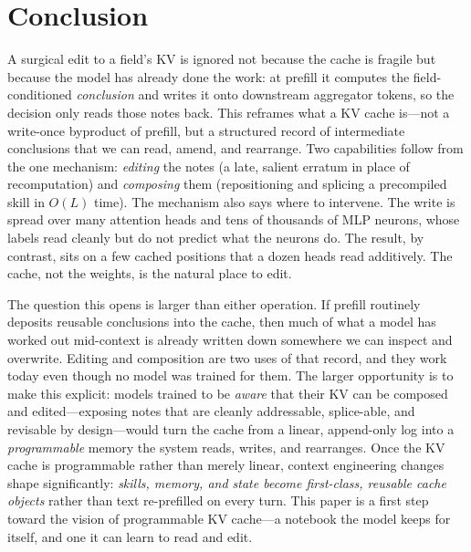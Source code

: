 \section{Conclusion}
\label{sec:conclusion}

A surgical edit to a field's KV is ignored not because the cache is fragile but because the model has
already done the work: at prefill it computes the field-conditioned \emph{conclusion} and writes it onto
downstream aggregator tokens, so the decision only reads those notes back. This reframes what a KV cache
is---not a write-once byproduct of prefill, but a structured record of intermediate conclusions that we can
read, amend, and rearrange. Two capabilities follow from the one mechanism: \emph{editing} the notes (a late,
salient erratum in place of recomputation) and \emph{composing} them (repositioning and splicing a
precompiled skill in $O(L)$ time). The mechanism also says where to intervene. The write is spread over many
attention heads and tens of thousands of MLP neurons, whose labels read cleanly but do not predict what the
neurons do. The result, by contrast, sits on a few cached positions that a dozen heads read additively. The
cache, not the weights, is the natural place to edit.

The question this opens is larger than either operation. If prefill routinely deposits reusable conclusions
into the cache, then much of what a model has worked out mid-context is already written down somewhere we can
inspect and overwrite. Editing
and composition are two uses of that record, and they work today even though no model was trained for them.
The larger opportunity is to make this explicit: models trained to be \emph{aware} that their KV can be
composed and edited---exposing notes that are cleanly addressable, splice-able, and revisable by design---would
turn the cache from a linear, append-only log into a \emph{programmable} memory the system reads, writes, and
rearranges. Once the KV cache is programmable rather than merely linear, context engineering changes
shape significantly: \emph{skills, memory, and state become first-class, reusable cache objects} rather than text re-prefilled
on every turn. This paper is a first step toward the vision of programmable KV
cache---a notebook the model keeps for itself, and one it can learn to read and edit.
